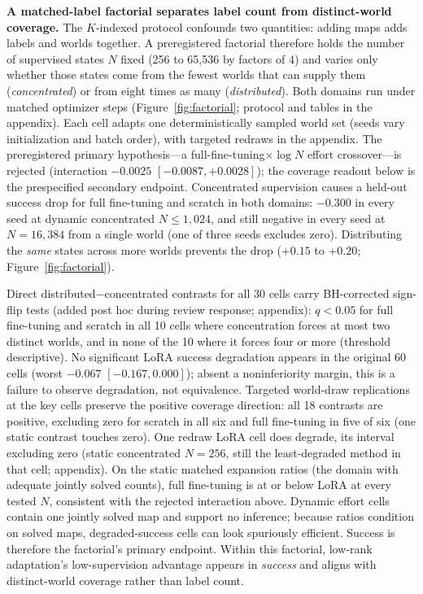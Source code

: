 \documentclass[letterpaper]{article} %
\begin{document}
\textbf{A matched-label factorial separates label count from distinct-world coverage.} The $K$-indexed protocol confounds two quantities: adding maps adds labels and worlds together. A preregistered factorial therefore holds the number of supervised states $N$ fixed (256 to 65{,}536 by factors of 4) and varies only whether those states come from the fewest worlds that can supply them (\emph{concentrated}) or from eight times as many (\emph{distributed}). Both domains run under matched optimizer steps (Figure~\ref{fig:factorial}; protocol and tables in the appendix). Each cell adapts one deterministically sampled world set (seeds vary initialization and batch order), with targeted redraws in the appendix. The preregistered primary hypothesis---a full-fine-tuning$\times\log N$ effort crossover---is rejected (interaction $-0.0025$ $[-0.0087, +0.0028]$); the coverage readout below is the prespecified secondary endpoint. Concentrated supervision causes a held-out success drop for full fine-tuning and scratch in both domains: $-0.300$ in every seed at dynamic concentrated $N \leq 1{,}024$, and still negative in every seed at $N{=}16{,}384$ from a single world (one of three seeds excludes zero). Distributing the \emph{same} states across more worlds prevents the drop ($+0.15$ to $+0.20$; Figure~\ref{fig:factorial}).

Direct distributed$-$concentrated contrasts for all 30 cells carry BH-corrected sign-flip tests (added post hoc during review response; appendix): $q{<}0.05$ for full fine-tuning and scratch in all 10 cells where concentration forces at most two distinct worlds, and in none of the 10 where it forces four or more (threshold descriptive). No significant LoRA success degradation appears in the original 60 cells (worst $-0.067$ $[-0.167, 0.000]$); absent a noninferiority margin, this is a failure to observe degradation, not equivalence. Targeted world-draw replications at the key cells preserve the positive coverage direction: all 18 contrasts are positive, excluding zero for scratch in all six and full fine-tuning in five of six (one static contrast touches zero). One redraw LoRA cell does degrade, its interval excluding zero (static concentrated $N{=}256$, still the least-degraded method in that cell; appendix). On the static matched expansion ratios (the domain with adequate jointly solved counts), full fine-tuning is at or below LoRA at every tested $N$, consistent with the rejected interaction above. Dynamic effort cells contain one jointly solved map and support no inference; because ratios condition on solved maps, degraded-success cells can look spuriously efficient. Success is therefore the factorial's primary endpoint. Within this factorial, low-rank adaptation's low-supervision advantage appears in \emph{success} and aligns with distinct-world coverage rather than label count.
\end{document}
